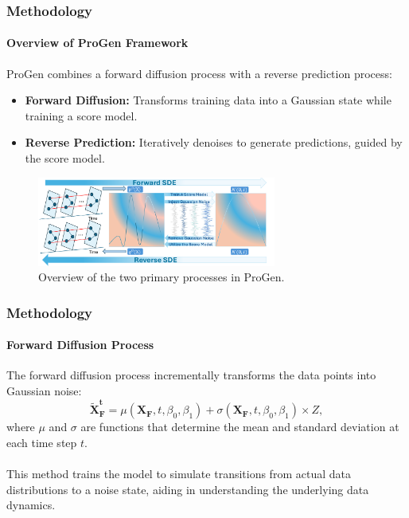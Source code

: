 \documentclass[light]{lutbeamer} %
\begin{document}
\begin{frame}
    \frametitle{Methodology}
    \framesubtitle{Overview of ProGen Framework}

    ProGen combines a forward diffusion process with a reverse prediction process:
    \begin{itemize}
        \item \textbf{Forward Diffusion:} Transforms training data into a Gaussian state while training a score model.
        \item \textbf{Reverse Prediction:} Iteratively denoises to generate predictions, guided by the score model.
    \end{itemize}

    \begin{figure}[ht]
        \centering
        \includegraphics[width=0.7\textwidth]{figures/ProGen_framework_new.pdf}
        \caption{Overview of the two primary processes in ProGen.}
        \label{fig:framework}
    \end{figure}

\end{frame}

\begin{frame}
    \frametitle{Methodology}
    \framesubtitle{Forward Diffusion Process}

    The forward diffusion process incrementally transforms the data points into Gaussian noise:
    \begin{equation}
        \mathbf{\tilde{X}^t_{F}} = \mu(\mathbf{X_{F}}, t, \beta_0, \beta_1) + \sigma(\mathbf{X_{F}}, t, \beta_0, \beta_1) \times Z,
    \end{equation}
    where \(\mu\) and \(\sigma\) are functions that determine the mean and standard deviation at each time step \(t\). \\~\\

    This method trains the model to simulate transitions from actual data distributions to a noise state, aiding in understanding the underlying data dynamics.
\end{frame}
\end{document}
